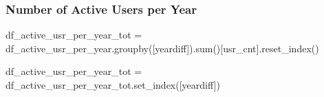 \documentclass[
  letterpaper,
  DIV=11,
  numbers=noendperiod]{scrartcl}
\newenvironment{Shaded}{\begin{snugshade}}{\end{snugshade}}
\newcommand{\BuiltInTok}[1]{\textcolor[rgb]{0.00,0.23,0.31}{#1}}
\newcommand{\NormalTok}[1]{\textcolor[rgb]{0.00,0.23,0.31}{#1}}
\newcommand{\OperatorTok}[1]{\textcolor[rgb]{0.37,0.37,0.37}{#1}}
\newcommand{\StringTok}[1]{\textcolor[rgb]{0.13,0.47,0.30}{#1}}
\begin{document}
\subsubsection{Number of Active Users per
Year}\label{number-of-active-users-per-year}

\begin{Shaded}
\begin{Highlighting}[]
\NormalTok{df\_active\_usr\_per\_year\_tot }\OperatorTok{=}\NormalTok{ df\_active\_usr\_per\_year.groupby([}\StringTok{\textquotesingle{}yeardiff\textquotesingle{}}\NormalTok{]).}\BuiltInTok{sum}\NormalTok{()[}\StringTok{\textquotesingle{}usr\_cnt\textquotesingle{}}\NormalTok{].reset\_index()}
\end{Highlighting}
\end{Shaded}

\begin{Shaded}
\begin{Highlighting}[]
\NormalTok{df\_active\_usr\_per\_year\_tot }\OperatorTok{=}\NormalTok{ df\_active\_usr\_per\_year\_tot.set\_index([}\StringTok{\textquotesingle{}yeardiff\textquotesingle{}}\NormalTok{])}
\end{Highlighting}
\end{Shaded}
\end{document}
